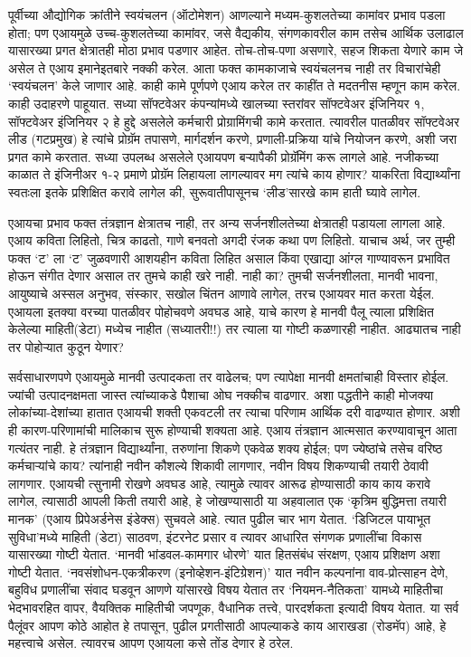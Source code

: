 पूर्वीच्या औद्योगिक क्रांतीने स्वयंचलन (ऑटोमेशन) आणल्याने मध्यम-कुशलतेच्या कामांवर प्रभाव पडला होता; पण एआयमुळे उच्च-कुशलतेच्या कामांवर, जसे वैद्यकीय, संगणकावरील काम तसेच आर्थिक उलाढाल यासारख्या प्रगत क्षेत्रातही मोठा प्रभाव पडणार आहेत. तोच-तोच-पणा असणारे, सहज शिकता येणारे काम जे असेल ते एआय इमानेइतबारे नक्की करेल. आता फक्त कामकाजाचे स्वयंचलनच नाही तर विचारांचेही `स्वयंचलन' केले जाणार आहे. काही कामे पूर्णपणे एआय करेल तर काहींत ते मदतनीस म्हणून काम करेल. काही उदाहरणे पाहूयात. सध्या सॉफ्टवेअर कंपन्यांमध्ये खालच्या  स्तरांवर  सॉफ्टवेअर इंजिनियर १, सॉफ्टवेअर इंजिनियर २ हे हुद्दे असलेले कर्मचारी प्रोग्रामिंगची कामे करतात. त्यावरील पातळीवर सॉफ्टवेअर लीड (गटप्रमुख) हे त्यांचे प्रोग्रॅम तपासणे, मार्गदर्शन करणे, प्रणाली-प्रक्रिया यांचे नियोजन करणे, अशी जरा प्रगत कामे करतात. सध्या उपलब्ध असलेले एआयपण बऱ्यापैकी प्रोग्रॅमिंग करू लागले आहे. नजीकच्या काळात ते इंजिनीअर १-२ प्रमाणे प्रोग्रॅम लिहायला लागल्यावर मग त्यांचे काय होणार? याकरिता विद्यार्थ्यांना स्वतःला इतके प्रशिक्षित करावे लागेल की, सुरूवातीपासूनच  `लीड'सारखे काम हाती घ्यावे लागेल.

एआयचा प्रभाव फक्त तंत्रज्ञान क्षेत्रातच नाही, तर अन्य सर्जनशीलतेच्या क्षेत्रातही पडायला लागला आहे. एआय कविता लिहितो, चित्र काढतो, गाणे बनवतो अगदी रंजक कथा पण लिहितो. याचाच अर्थ, जर तुम्ही फक्त `ट' ला `ट' जुळवणारी आशयहीन कविता लिहित असाल किंवा एखाद्या आंग्ल गाण्यावरून प्रभावित होऊन संगीत देणार असाल तर तुमचे काही खरे नाही. नाही का? तुमची सर्जनशीलता, मानवी भावना, आयुष्याचे अस्सल अनुभव, संस्कार, सखोल चिंतन आणावे लागेल, तरच एआयवर मात करता येईल. एआयला इतक्या वरच्या पातळीवर पोहोचवणे अवघड आहे, याचे कारण हे मानवी पैलू त्याला प्रशिक्षित केलेल्या माहिती(डेटा) मध्येच नाहीत (सध्यातरी!!) तर त्याला या गोष्टी कळणारही नाहीत. आढ्यातच नाही तर पोहोऱ्यात कुठून येणार?

सर्वसाधारणपणे एआयमुळे मानवी उत्पादकता तर वाढेलच; पण त्यापेक्षा मानवी क्षमतांचाही विस्तार होईल. ज्यांची उत्पादनक्षमता जास्त त्यांच्याकडे पैशाचा ओघ नक्कीच वाढणार. अशा पद्धतीने काही मोजक्या लोकांच्या-देशांच्या हातात एआयची शक्ती एकवटली तर त्याचा परिणाम आर्थिक दरी वाढण्यात होणार. अशी ही कारण-परिणामांची मालिकाच सुरू होण्याची शक्यता आहे. एआय तंत्रज्ञान आत्मसात करण्यावाचून आता गत्यंतर नाही. हे तंत्रज्ञान विद्यार्थ्यांना, तरुणांना शिकणे एकवेळ शक्य होईल; पण ज्येष्ठांचे तसेच वरिष्ठ कर्मचाऱ्यांचे काय? त्यांनाही नवीन कौशल्ये शिकावी लागणार, नवीन विषय शिकण्याची तयारी ठेवावी लागणार.  एआयची त्सुनामी रोखणे अवघड आहे, त्यामुळे त्यावर आरूढ होण्यासाठी काय काय करावे लागेल, त्यासाठी आपली किती तयारी आहे, हे जोखण्यासाठी या अहवालात एक `कृत्रिम बुद्धिमत्ता तयारी मानक' (एआय प्रिपेअर्डनेस इंडेक्स) सुचवले आहे. त्यात पुढील चार भाग येतात. `डिजिटल पायाभूत सुविधा'मध्ये माहिती (डेटा) साठवण, इंटरनेट प्रसार व त्यावर आधारित संगणक प्रणालींचा विकास यासारख्या गोष्टी येतात. `मानवी भांडवल-कामगार धोरणे' यात हितसंबंध संरक्षण, एआय प्रशिक्षण अशा गोष्टी येतात. `नवसंशोधन-एकत्रीकरण (इनोव्हेशन-इंटिग्रेशन)' यात नवीन कल्पनांना वाव-प्रोत्साहन देणे, बहुविध प्रणालींचा संवाद घडवून आणणे यांसारखे विषय येतात तर `नियमन-नैतिकता' यामध्ये माहितीचा भेदभावरहित वापर, वैयक्तिक माहितीची जपणूक, वैधानिक तत्त्वे, पारदर्शकता इत्यादी विषय येतात. या सर्व पैलूंवर आपण कोठे आहोत हे तपासून, पुढील प्रगतीसाठी आपल्याकडे काय आराखडा (रोडमॅप) आहे, हे महत्त्वाचे असेल. त्यावरच आपण एआयला कसे तोंड देणार हे ठरेल.

